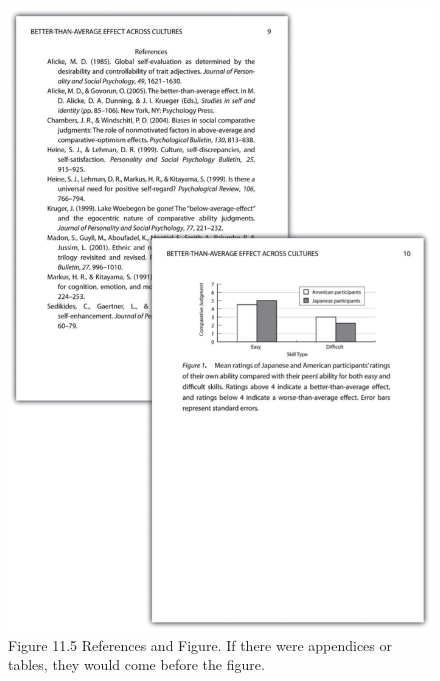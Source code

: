 \begin{figure}
\includegraphics[width=\linewidth]{figures/115}
\caption{Figure 11.5 References and Figure. If there were appendices or tables, they would come before the figure.}
\label{fig:p5}
\end{figure}

